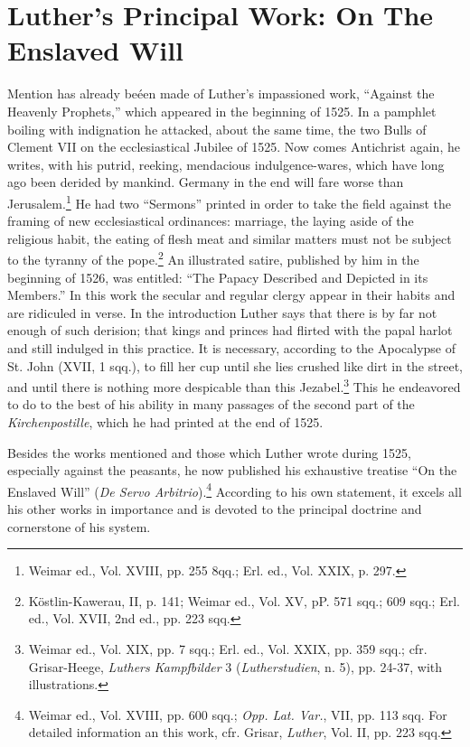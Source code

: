 \section{Luther’s Principal Work: On The Enslaved Will}

Mention has already beéen made of Luther’s impassioned work,
“Against the Heavenly Prophets,” which appeared in the beginning
of 1525. In a pamphlet boiling with indignation he attacked, about
the same time, the two Bulls of Clement VII on the ecclesiastical
Jubilee of 1525. Now comes Antichrist again, he writes, with his
putrid, reeking, mendacious indulgence-wares, which have long ago
been derided by mankind. Germany in the end will fare worse
than Jerusalem.\footnote{Weimar ed., Vol. XVIII, pp. 255 8qq.; Erl. ed., Vol. XXIX, p. 297.}
He had two “Sermons” printed in order to take the
field against the framing of new ecclesiastical ordinances: marriage,
the laying aside of the religious habit, the eating of flesh meat and
similar matters must not be subject to the tyranny of the pope.\footnote
{Köstlin-Kawerau, II, p. 141; Weimar ed., Vol. XV, pP. 571 sqq.; 609 sqq.; Erl. ed.,
Vol. XVII, 2nd ed., pp. 223 sqq.}
An illustrated satire, published by him in the beginning of 1526,
was entitled: “The Papacy Described and Depicted in its Members.”
In this work the secular and regular clergy appear in their habits
and are ridiculed in verse. In the introduction Luther says that there
is by far not enough of such derision; that kings and princes had
flirted with the papal harlot and still indulged in this practice. It
is necessary, according to the Apocalypse of St. John (XVII, 1 sqq.),
to fill her cup until she lies crushed like dirt in the street, and until
there is nothing more despicable than this Jezabel.\footnote
{Weimar ed., Vol. XIX, pp. 7 sqq.; Erl. ed., Vol. XXIX, pp. 359 sqq.; cfr. Grisar-Heege,
\textit{Luthers Kampfbilder} 3 (\textit{Lutherstudien}, n. 5), pp. 24-37, with illustrations.}
This he endeavored to do to the best of his ability in many passages of the
second part of the \textit{Kirchenpostille}, which he had printed at the
end of 1525.

Besides the works mentioned and those which Luther wrote during 1525,
especially against the peasants, he now published his exhaustive
treatise “On the Enslaved Will” (\textit{De Servo Arbitrio}).\footnote
{Weimar ed., Vol. XVIII, pp. 600 sqq.; \textit{Opp. Lat. Var.}, VII, pp. 113 sqq. For detailed
information an this work, cfr. Grisar, \textit{Luther}, Vol. II, pp. 223 sqq.}
According to his own statement, it excels all his other works in
importance and is devoted to the principal doctrine and cornerstone
of his system.

